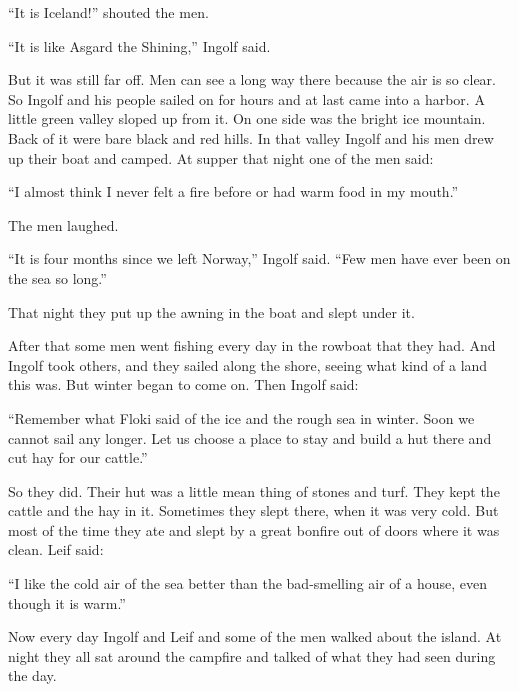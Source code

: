 ``It is Iceland!'' shouted the men.

``It is like Asgard the Shining,'' Ingolf said.

But it was still far off. Men can see a long way there because the air
is so clear. So Ingolf and his people sailed on for hours and at last
came into a harbor. A little green valley sloped up from it. On one side
was the bright ice mountain. Back of it were bare black and red hills.
In that valley Ingolf and his men drew up their boat and camped. At
supper that night one of the men said:

``I almost think I never felt a fire before or had warm food in my
mouth.''

The men laughed.

``It is four months since we left Norway,'' Ingolf said. ``Few men have
ever been on the sea so long.''

That night they put up the awning in the boat and slept under it.

After that some men went fishing every day in the rowboat that they had.
And Ingolf took others, and they sailed along the shore, seeing what
kind of a land this was. But winter began to come on. Then Ingolf said:

``Remember what Floki said of the ice and the rough sea in winter. Soon
we cannot sail any longer. Let us choose a place to stay and build a hut
there and cut hay for our cattle.''

So they did. Their hut was a little mean thing of stones and turf. They
kept the cattle and the hay in it. Sometimes they slept there, when it
was very cold. But most of the time they ate and slept by a great
bonfire out of doors where it was clean. Leif said:

``I like the cold air of the sea better than the bad-smelling air of a
house, even though it is warm.''

Now every day Ingolf and Leif and some of the men walked about the
island. At night they all sat around the campfire and talked of what
they had seen during the day.

